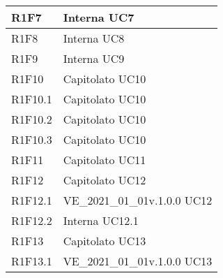 \begin{center}
\begin{longtable}{|p{22mm}|p{44mm}|}
R1F7 &
Interna \newline
UC7 \newline
\\
\hline

R1F8 &
Interna \newline
UC8 \newline
\\
\hline

R1F9 &
Interna \newline
UC9 \newline
\\
\hline

R1F10 &
Capitolato \newline
UC10 \newline
\\
\hline

R1F10.1 &
Capitolato \newline
UC10 \newline
\\
\hline

R1F10.2 &
Capitolato \newline
UC10 \newline
\\
\hline

R1F10.3 &
Capitolato \newline
UC10 \newline
\\
\hline

R1F11 &
Capitolato \newline
UC11 \newline
\\
\hline

R1F12 &
Capitolato \newline
UC12 \newline
\\
\hline

R1F12.1 &
VE\_2021\_01\_01v.1.0.0 \newline
UC12 \newline
\\
\hline

R1F12.2 &
Interna \newline
UC12.1 \newline
\\
\hline

R1F13 &
Capitolato \newline
UC13 \newline
\\
\hline

R1F13.1 &
VE\_2021\_01\_01v.1.0.0 \newline
UC13 \newline
\\
\hline


\end{longtable}
\end{center}
